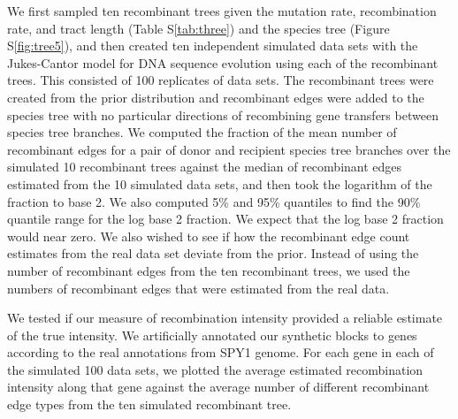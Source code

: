 \documentclass[10pt]{article}
\begin{document}
We first sampled ten recombinant trees given the mutation rate, recombination
rate, and tract length (Table S\ref{tab:three}) and the species tree (Figure
S\ref{fig:tree5}), and then created ten independent simulated data sets with
the Jukes-Cantor model for DNA sequence evolution using each of the recombinant
trees. This consisted of 100 replicates of data sets.  The recombinant trees
were created from the prior distribution and recombinant edges were added to the
species tree with no particular directions of recombining gene transfers between
species tree branches.  We computed the fraction of the mean number of recombinant
edges for a pair of donor and recipient species tree branches over the simulated
10 recombinant trees against the median of recombinant edges estimated from the
10 simulated data sets, and then took the logarithm of the fraction to base 2. We
also computed 5\% and 95\% quantiles to find the 90\% quantile range for the log
base 2 fraction.  We expect that the log base 2 fraction would near zero. We also
wished to see if how the recombinant edge count estimates from the real data set
deviate from the prior. Instead of using the number of recombinant edges from
the ten recombinant trees, we used the numbers of recombinant edges that were
estimated from the real data. 

We tested if our measure of recombination intensity provided a reliable estimate
of the true intensity. We artificially annotated our synthetic blocks to genes
according to the real annotations from SPY1 genome.  For each gene in each of
the simulated 100 data sets, we plotted the average estimated recombination
intensity along that gene against the average number of different recombinant
edge types from the ten simulated recombinant tree. 



\end{document}
